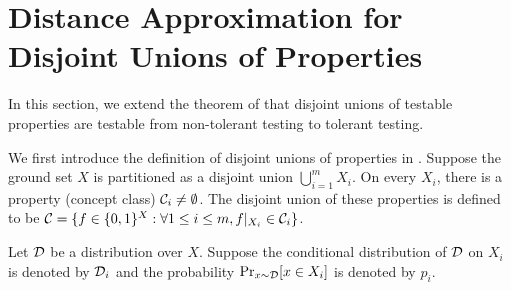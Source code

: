 \section{Distance Approximation for Disjoint Unions of Properties}
\label{sec:union}
In this section, we extend the theorem of \citet{BBBY12} that disjoint unions of testable properties are testable from non-tolerant testing to tolerant testing. 



We first introduce the definition of disjoint unions of properties in \citep{BBBY12}. Suppose the ground set $X$ is partitioned as a disjoint union $\bigcup\limits_{i=1}^m X_i$. On every $X_i$, there is a property (concept class) ${\mathcal{C}}_i\neq\emptyset$. The disjoint union of these properties is defined to be ${\mathcal{C}}=\{f\in\{0,1\}^X:\forall 1\leq i\leq m,f|_{X_i}\in{\mathcal{C}}_i\}$.

Let ${\mathcal{D}}$ be a distribution over $X$. Suppose the conditional distribution of ${\mathcal{D}}$ on $X_i$ is denoted by ${\mathcal{D}}_i$ and the probability $\Pr_{x\sim{\mathcal{D}}}[x\in X_i]$ is denoted by $p_i$.

